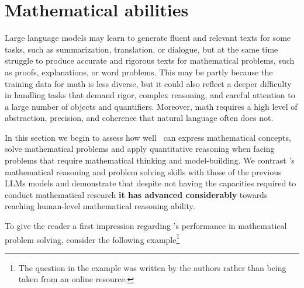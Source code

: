 \newpage
\section{Mathematical abilities}
\label{sec:math}

Large language models may learn to generate fluent and relevant texts for some tasks, such as summarization, translation, or dialogue, but at the same time struggle to produce accurate and rigorous texts for mathematical problems, such as proofs, explanations, or word problems. This may be partly because the training data for math is less diverse, but it could also reflect a deeper difficulty in handling tasks that demand rigor, complex reasoning, and careful attention to a large number of objects and quantifiers. Moreover, math requires a high level of abstraction, precision, and coherence that natural language often does not.

\iffalse
Mathematical reasoning is not only essential for many academic and professional domains, but also for everyday tasks such as budgeting, planning, and reasoning about data. 

Moreover, LLMs may have difficulty in understanding and representing the complex and hierarchical structures, symbols, and operations that are involved in mathematical expressions and equations, which often require specialized parsing, reasoning, and generation techniques.
\fi

In this section we begin to assess how well \DV \ can express mathematical concepts, solve mathematical problems and apply quantitative reasoning when facing problems that require mathematical thinking and model-building. We contrast \DV's mathematical reasoning and problem solving skills with those of the previous LLMs models and demonstrate that despite not having the capacities required to conduct mathematical research \textbf{it has advanced considerably} towards reaching human-level mathematical reasoning ability.

To give the reader a first impression regarding \DV's performance in mathematical problem solving, consider the following example\footnote{The question in the example was written by the authors rather than being taken from an online resource.}


